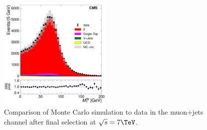 \begin{figure}[hbtp]
     \includegraphics[width=0.48\textwidth]{Chapters/04_Analysis/04b_XSections/images/control_plots/before_fit/7TeV/MuPlusJets_patType1CorrectedPFMet_MT_2orMoreBtags_with_ratio.pdf}\hfill
     \caption{Comparison of Monte Carlo simulation to data in the muon+jets channel after final
     selection at $\sqrt{s}=7\TeV$.}
     \label{fig:data_mc_comparison_7TeV_muon}
\end{figure}
 

